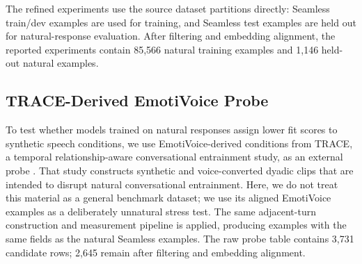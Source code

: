 \documentclass[conference]{IEEEtran}
\begin{document}
The refined experiments use the source dataset partitions directly: Seamless train/dev examples are used for training, and Seamless test examples are held out for natural-response evaluation.
After filtering and embedding alignment, the reported experiments contain 85,566 natural training examples and 1,146 held-out natural examples.

\subsection{TRACE-Derived EmotiVoice Probe}
To test whether models trained on natural responses assign lower fit scores to synthetic speech conditions, we use EmotiVoice-derived conditions from TRACE, a temporal relationship-aware conversational entrainment study, as an external probe \cite{TRACE}.
That study constructs synthetic and voice-converted dyadic clips that are intended to disrupt natural conversational entrainment.
Here, we do not treat this material as a general benchmark dataset; we use its aligned EmotiVoice examples as a deliberately unnatural stress test.
The same adjacent-turn construction and measurement pipeline is applied, producing examples with the same fields as the natural Seamless examples.
The raw probe table contains 3,731 candidate rows; 2,645 remain after filtering and embedding alignment.

\begin{table}[t]
\centering
\caption{Data and feature summary. Counts are examples after adjacent-turn construction; modeled examples are after filtering and embedding alignment.}
\label{tab:data_summary}
\scriptsize
\setlength{\tabcolsep}{3.5pt}
\end{table}
\end{document}
